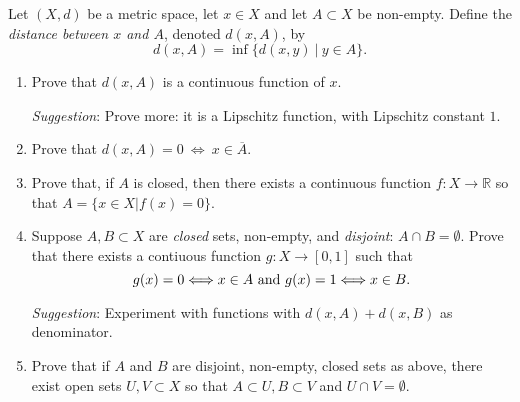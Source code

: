 \documentclass{jhwhw}
\newcommand{\R}{{\mathbb R}}
\begin{document}
\problem{}%
Let $(X,d)$ be a metric space, let $x\in X$ and let $A\subset X$ be non-empty.  Define the \emph{distance between $x$ and $A$}, denoted $d(x,A)$, by
$$
d(x,A) = \inf \{d(x,y)\  | \  y\in A\}.
$$
\begin{enumerate}
	\item Prove that $d(x,A)$ is a continuous function of $x$. 
	
	\emph{Suggestion}:  Prove more: it is a Lipschitz function, with Lipschitz constant $1$.
	
	\item Prove that $d(x,A) = 0\  \Longleftrightarrow \  x\in\overline{A}$.
	
	\item Prove that, if $A$ is closed, then there exists a continuous function $f:X\to\R$ so that $ A = \{x\in X | f(x) = 0\}$.
	
	
	
	\item Suppose $A,B\subset X$ are \emph{closed} sets, non-empty, and \emph{disjoint}: $A\cap B = \emptyset$. Prove that there exists a contiuous function $g:X\to [0,1]$ such that 
	$$
	g(x) = 0 \Longleftrightarrow x\in A \hbox{ and } g(x) = 1 \Longleftrightarrow x\in B.
	$$
	
	\emph{Suggestion}: Experiment with  functions with $d(x,A) + d(x,B)$ as denominator.
	
	\item Prove that if $A$ and $B$ are disjoint, non-empty, closed sets as above, there exist open sets $U,V\subset X$ so that $A\subset U, B\subset V$ and $U\cap V = \emptyset$.
\end{enumerate}

\solution{}
\part{}
\end{document}
